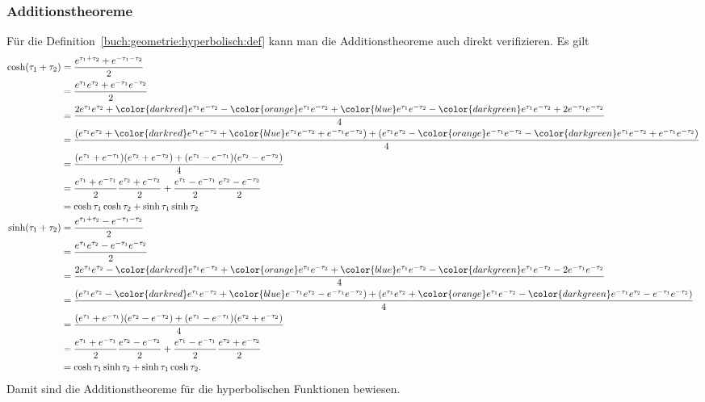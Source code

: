\subsubsection{Additionstheoreme}
Für die Definition~\ref{buch:geometrie:hyperbolisch:def} kann man die
Additionstheoreme auch direkt verifizieren.
Es gilt
\begin{align*}
\cosh(\tau_1+\tau_2)
&=
\frac{e^{\tau_1+\tau_2}+e^{-\tau_1-\tau_2}}{2}
\\
&=
\frac{e^{\tau_1}e^{\tau_2}+e^{-\tau_1}e^{-\tau_2}}{2}
\\
&=
\frac{2e^{\tau_1}e^{\tau_2}
+
{\color{darkred}e^{\tau_1}e^{-\tau_2}}
-
{\color{orange}e^{\tau_1}e^{-\tau_2}}
+
{\color{blue}e^{\tau_1}e^{-\tau_2}}
-
{\color{darkgreen}e^{\tau_1}e^{-\tau_2}}
+
2e^{-\tau_1}e^{-\tau_2}}{4}
\\
&=
\frac{
(e^{\tau_1}e^{\tau_2}
+
{\color{darkred}e^{\tau_1}e^{-\tau_2}}
+
{\color{blue}e^{\tau_1}e^{-\tau_2}}
+
e^{-\tau_1}e^{-\tau_2}
)
+
(
e^{\tau_1}e^{\tau_2}
-
{\color{orange}e^{-\tau_1}e^{-\tau_2}}
-
{\color{darkgreen}e^{\tau_1}e^{-\tau_2}}
+
e^{-\tau_1}e^{-\tau_2})
}{4}
\\
&=
\frac{
(e^{\tau_1}+e^{-\tau_1})
(e^{\tau_2}+e^{-\tau_2})
+
(e^{\tau_1}-e^{-\tau_1})
(e^{\tau_2}-e^{-\tau_2})
}{4}
\\
&=
\frac{ e^{\tau_1}+e^{-\tau_1} }{2}
\frac{ e^{\tau_2}+e^{-\tau_2} }{2}
+
\frac{e^{\tau_1}-e^{-\tau_1}}{2}
\frac{e^{\tau_2}-e^{-\tau_2}}{2}
\\
&=
\cosh\tau_1 \cosh\tau_2 + \sinh\tau_1\sinh\tau_2
\\
\sinh(\tau_1+\tau_2)
&=
\frac{e^{\tau_1+\tau_2}-e^{-\tau_1-\tau_2}}{2}
\\
&=
\frac{e^{\tau_1}e^{\tau_2}-e^{-\tau_1}e^{-\tau_2}}{2}
\\
&=
\frac{2e^{\tau_1}e^{\tau_2}
-
{\color{darkred}e^{\tau_1}e^{-\tau_2}}
+
{\color{orange}e^{\tau_1}e^{-\tau_2}}
+
{\color{blue}e^{\tau_1}e^{-\tau_2}}
-
{\color{darkgreen}e^{\tau_1}e^{-\tau_2}}
-
2e^{-\tau_1}e^{-\tau_2}}{4}
\\
&=
\frac{
(e^{\tau_1}e^{\tau_2}
-
{\color{darkred}e^{\tau_1}e^{-\tau_2}}
+
{\color{blue}e^{-\tau_1}e^{\tau_2}}
-
e^{-\tau_1}e^{-\tau_2}
)
+
(
e^{\tau_1}e^{\tau_2}
+
{\color{orange}e^{\tau_1}e^{-\tau_2}}
-
{\color{darkgreen}e^{-\tau_1}e^{\tau_2}}
-
e^{-\tau_1}e^{-\tau_2})
}{4}
\\
&=
\frac{
(e^{\tau_1}+e^{-\tau_1})
(e^{\tau_2}-e^{-\tau_2})
+
(e^{\tau_1}-e^{-\tau_1})
(e^{\tau_2}+e^{-\tau_2})
}{4}
\\
&=
\frac{ e^{\tau_1}+e^{-\tau_1} }{2}
\frac{ e^{\tau_2}-e^{-\tau_2} }{2}
+
\frac{e^{\tau_1}-e^{-\tau_1}}{2}
\frac{e^{\tau_2}+e^{-\tau_2}}{2}
\\
&=
\cosh\tau_1 \sinh\tau_2 + \sinh\tau_1\cosh\tau_2.
\end{align*}
Damit sind die Additionstheoreme für die hyperbolischen Funktionen
bewiesen.
